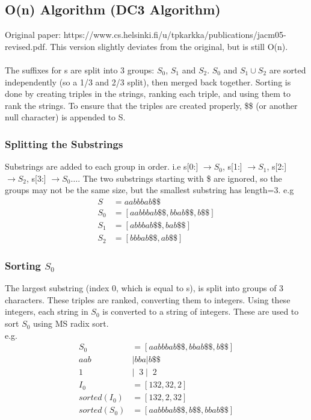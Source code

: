 \subsection{O(n) Algorithm (DC3 Algorithm)}
Original paper: https://www.cs.helsinki.fi/u/tpkarkka/publications/jacm05-revised.pdf. This version slightly deviates from the original, but is still O(n).\\ \\
The suffixes for s are split into 3 groups: $S_0$, $S_1$ and $S_2$. $S_0$ and $S_1 \cup S_2$ are sorted independently (so a 1/3 and 2/3 split), then merged back together. Sorting is done by creating triples in the strings, ranking each triple, and using them to rank the strings. To ensure that the triples are created properly, \$\$ (or another null character) is appended to S.        

\subsubsection{Splitting the Substrings}
Substrings are added to each group in order. i.e s[0:] $\rightarrow S_0$, s[1:] $\rightarrow S_1$, s[2:] $\rightarrow S_2$, s[3:] $\rightarrow S_0 \dots$. The two substrings starting with \$ are ignored, so the groups may not be the same size, but the smallest substring has length=3. e.g
\begin{align}
    S &= aabbbab\$\$ \nonumber \\
    S_0 &= [aabbbab\$\$, bbab\$\$, b\$\$ ] \nonumber \\
    S_1 &= [abbbab\$\$, bab\$\$] \nonumber \\
    S_2 &= [bbbab\$\$, ab\$\$] \nonumber 
\end{align}

\subsubsection{Sorting $S_0$}
The largest substring (index 0, which is equal to s), is split into groups of 3 characters. These triples are ranked, converting them to integers. Using these integers, each string in $S_0$ is converted to a string of integers. These are used to sort $S_0$ using MS radix sort. \\
e.g.
\begin{align}
    S_0 &= [aabbbab\$\$, bbab\$\$, b\$\$ ] \nonumber \\
    aab&|bba|b\$\$ \nonumber \\
     1\; &|\;\;3\;|\;\; 2\,  \nonumber \\
    I_0 &= [132, 32, 2] \nonumber \\
    sorted(I_0) &= [132, 2, 32] \nonumber \\
    sorted(S_0) &= [aabbbab\$\$, b\$\$, bbab\$\$ ] \nonumber 
\end{align}

